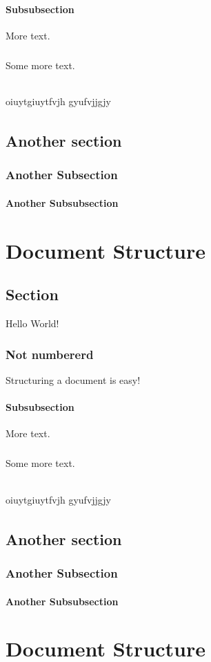 \documentclass{book}
\begin{document}
	\subsubsection{Subsubsection}
	More text.
	\paragraph{}
	Some more text.
	\subparagraph{}
	oiuytgiuytfvjh gyufvjjgjy
	
	\subparagraph{}
	\lipsum[1]
	\section{Another section}
	\subsection{Another Subsection}
	\subsubsection{Another Subsubsection}
	\lipsum[1-3]
\chapter{Document Structure}
	\section{Section}
	Hello World!
	\subsection*{Not numbererd}
	Structuring a document is easy!
	\subsubsection{Subsubsection}
	More text.
	\paragraph{}
	Some more text.
	\subparagraph{}
	oiuytgiuytfvjh gyufvjjgjy
	
	\subparagraph{}
	\lipsum[1]
	\section{Another section}
	\subsection{Another Subsection}
	\subsubsection{Another Subsubsection}
	\lipsum[1-3]\chapter{Document Structure}
\end{document}
